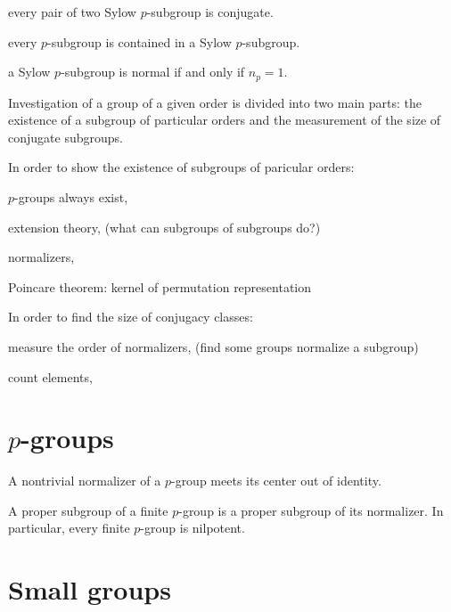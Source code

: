 \documentclass{../../large}
\begin{document}
\begin{parts}
\item every pair of two Sylow $p$-subgroup is conjugate.
\item every $p$-subgroup is contained in a Sylow $p$-subgroup.
\item a Sylow $p$-subgroup is normal if and only if $n_p=1$.
\end{parts}

Investigation of a group of a given order is divided into two main parts: the existence of a subgroup of particular orders and the measurement of the size of conjugate subgroups.

In order to show the existence of subgroups of paricular orders:
\begin{parts}
\item $p$-groups always exist,
\item extension theory, (what can subgroups of subgroups do?)
\item normalizers,
\item Poincare theorem: kernel of permutation representation
\end{parts}

In order to find the size of conjugacy classes:
\begin{parts}
\item measure the order of normalizers, (find some groups normalize a subgroup)
\item count elements,
\end{parts}

\section{$p$-groups}


\begin{prb}[$p$-groups]
\begin{parts}
\item A nontrivial normalizer of a $p$-group meets its center out of identity.
\item A proper subgroup of a finite $p$-group is a proper subgroup of its normalizer. In particular, every finite $p$-group is nilpotent.
\end{parts}
\end{prb}


\section{Small groups}

\begin{prb}
\end{prb}
\end{document}
